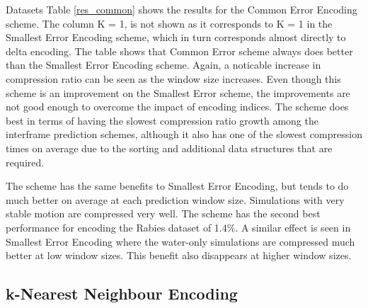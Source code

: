 \documentclass[a4paper,11pt]{report}
\begin{document}
\begin{section}{Datasets}
Table \ref{res_common} shows the results for the Common Error Encoding scheme. The column K = 1, is not shown as it corresponds to K = 1 in the Smallest Error Encoding scheme, which in turn corresponds almost directly to delta encoding. The table shows that Common Error scheme always does better than the Smallest Error Encoding scheme. Again, a noticable increase in compression ratio can be seen as the window size increases. Even though this scheme is an improvement on the Smallest Error scheme, the improvements are not good enough to overcome the impact of encoding indices. The scheme does best in terms of having the slowest compression ratio growth among the interframe prediction schemes, although it also has one of the slowest compression times on average due to the sorting and additional data structures that are required. 

The scheme has the same benefits to Smallest Error Encoding, but tends to do much better on average at each prediction window size. Simulations with very stable motion are compressed very well. The scheme has the second best performance for encoding the Rabies dataset of 1.4\%. A similar effect is seen in Smallest Error Encoding where the water-only simulations are compressed much better at low window sizes. This benefit also disappears at higher window sizes.

\subsection{k-Nearest Neighbour Encoding} 

\begin{table}
\begin{center}
\end{center}
\caption{}
\label{res_nn1}
\end{table}


\end{section}
\end{document}
